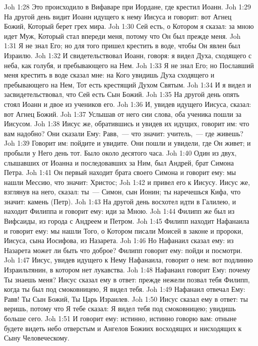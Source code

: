 \vs Joh 1:28 Это происходило в Вифаваре при Иордане, где крестил Иоанн.
\rsbpar\vs Joh 1:29 На другой день видит Иоанн идущего к нему Иисуса и говорит: вот Агнец Божий, Который берет  грех мира.
\vs Joh 1:30 Сей есть, о Котором я сказал: за мною идет Муж, Который стал впереди меня, потому что Он был прежде меня.
\vs Joh 1:31 Я не знал Его; но для того пришел крестить в воде, чтобы Он явлен был Израилю.
\vs Joh 1:32 И свидетельствовал Иоанн, говоря: я видел Духа, сходящего с неба, как голубя, и пребывающего на Нем.
\vs Joh 1:33 Я не знал Его; но Пославший меня крестить в воде сказал мне: на Кого увидишь Духа сходящего и пребывающего на Нем, Тот есть крестящий Духом Святым.
\vs Joh 1:34 И я видел и засвидетельствовал, что Сей есть Сын Божий.
\rsbpar\vs Joh 1:35 На другой день опять стоял Иоанн и двое из учеников его.
\vs Joh 1:36 И, увидев идущего Иисуса, сказал: вот Агнец Божий.
\vs Joh 1:37 Услышав от него сии слова, оба ученика пошли за Иисусом.
\vs Joh 1:38 Иисус же, обратившись и увидев их идущих, говорит им: что вам надобно? Они сказали Ему: Равв,~--- что значит: учитель,~--- где живешь?
\vs Joh 1:39 Говорит им: пойдите и увидите. Они пошли и увидели, где Он живет; и пробыли у Него день тот. Было около десятого часа.
\vs Joh 1:40 Один из двух, слышавших от Иоанна  и последовавших за Ним, был Андрей, брат Симона Петра.
\vs Joh 1:41 Он первый находит брата своего Симона и говорит ему: мы нашли Мессию, что значит: Христос;
\vs Joh 1:42 и привел его к Иисусу. Иисус же, взглянув на него, сказал: ты~--- Симон, сын Ионин; ты наречешься Кифа, что значит: камень (Петр).
\rsbpar\vs Joh 1:43 На другой день  восхотел идти в Галилею, и находит Филиппа и говорит ему: иди за Мною.
\vs Joh 1:44 Филипп же был из Вифсаиды, из  города с Андреем и Петром.
\vs Joh 1:45 Филипп находит Нафанаила и говорит ему: мы нашли Того, о Котором писали Моисей в законе и пророки, Иисуса, сына Иосифова, из Назарета.
\vs Joh 1:46 Но Нафанаил сказал ему: из Назарета может ли быть что доброе? Филипп говорит ему: пойди и посмотри.
\vs Joh 1:47 Иисус, увидев идущего к Нему Нафанаила, говорит о нем: вот подлинно Израильтянин, в котором нет лукавства.
\vs Joh 1:48 Нафанаил говорит Ему: почему Ты знаешь меня? Иисус сказал ему в ответ: прежде нежели позвал тебя Филипп, когда ты был под смоковницею, Я видел тебя.
\vs Joh 1:49 Нафанаил отвечал Ему: Равв! Ты Сын Божий, Ты Царь Израилев.
\vs Joh 1:50 Иисус сказал ему в ответ: ты веришь, потому что Я тебе сказал: Я видел тебя под смоковницею; увидишь больше сего.
\vs Joh 1:51 И говорит ему: истинно, истинно говорю вам: отныне будете видеть небо отверстым и Ангелов Божиих восходящих и нисходящих к Сыну Человеческому.

